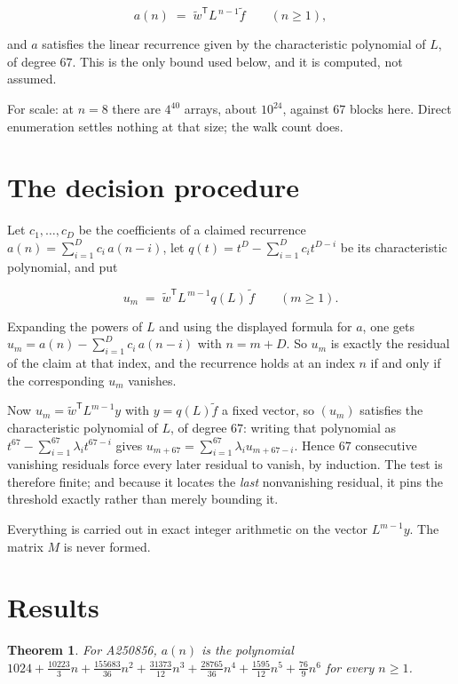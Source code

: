 \documentclass[11pt]{article}
\newtheorem{theorem}{Theorem}
\theoremstyle{definition}
\begin{document}
\[a(n) \;=\; \tilde w^{\mathsf T} L^{\,n-1} \tilde f \qquad (n \ge 1),\]

and $a$ satisfies the linear recurrence given by the characteristic polynomial of $L$, of degree $67$. This is the only bound used below, and it is computed, not assumed.

For scale: at $n = 8$ there are $4^{40}$ arrays, about $10^{24}$, against $67$ blocks here. Direct enumeration settles nothing at that size; the walk count does.

\section{The decision procedure}

Let $c_1,\dots,c_D$ be the coefficients of a claimed recurrence $a(n) = \sum_{i=1}^{D} c_i\,a(n-i)$, let $q(t) = t^{D} - \sum_{i=1}^{D} c_i t^{D-i}$ be its characteristic polynomial, and put

\[u_m \;=\; \tilde w^{\mathsf T} L^{\,m-1} q(L)\,\tilde f \qquad (m \ge 1).\]

Expanding the powers of $L$ and using the displayed formula for $a$, one gets $u_m = a(n) - \sum_{i=1}^{D} c_i\,a(n-i)$ with $n = m + D$. So $u_m$ is exactly the residual of the claim at that index, and the recurrence holds at an index $n$ if and only if the corresponding $u_m$ vanishes.

Now $u_m = \tilde w^{\mathsf T} L^{m-1} y$ with $y = q(L)\tilde f$ a fixed vector, so $(u_m)$ satisfies the characteristic polynomial of $L$, of degree $67$: writing that polynomial as $t^{67} - \sum_{i=1}^{67} \lambda_i t^{67-i}$ gives $u_{m+67} = \sum_{i=1}^{67} \lambda_i u_{m+67-i}$. Hence $67$ consecutive vanishing residuals force every later residual to vanish, by induction. The test is therefore finite; and because it locates the {\itshape last} nonvanishing residual, it pins the threshold exactly rather than merely bounding it.

Everything is carried out in exact integer arithmetic on the vector $L^{m-1}y$. The matrix $M$ is never formed.

\section{Results}

\begin{theorem} For A250856, $a(n)$ is the polynomial $1024 + \frac{10223}{3}n + \frac{155683}{36}n^{2} + \frac{31373}{12}n^{3} + \frac{28765}{36}n^{4} + \frac{1595}{12}n^{5} + \frac{76}{9}n^{6}$ for every $n \ge 1$.\end{theorem}
\end{document}
